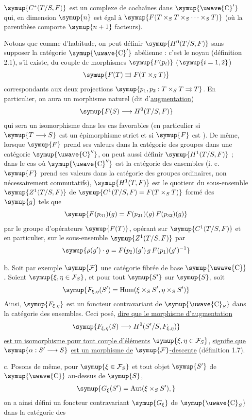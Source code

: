 $\symup{C^*(T/S,F)}$ est un complexe de cochaînes dans $\symup{\text{\uwave{C}}'}$ qui, en dimension
$\symup{n}$ est égal à $\symup{F(T\times_ST\times_S\cdots\times_ST)}$ (où la parenthèse comporte $\symup{n+1}$ facteurs).

Notons que comme d'habitude, on peut définir $\symup{H^0(T/S,F)}$ sans supposer la
catégorie $\symup{\text{\uwave{C}}'}$ abélienne : c'est le noyau (définition 2.1), s'il
existe, du couple de morphismes $\symup{F(p_i)}$ ($\symup{i=1,2}$)
\[
  \symup{F(T)\rightrightarrows F(T\times_ST)}
\]
correspondants aux deux projections
$\symup{p_1,p_2:T\times_ST\rightrightarrows T}$. En particulier, on aura un morphisme
naturel (dit d'\uline{augmentation})
\[
  \symup{F(S)\longrightarrow H^0(T/S,F)}
\]
qui sera un isomorphisme dans les cas favorables (en particulier si
$\symup{T\longrightarrow S}$ est un épimorphisme strict et si $\symup{F}$ est ). De même, lorsque $\symup{F}$ prend ses valeurs dans la catégorie des groupes
dans une catégorie $\symup{\text{\uwave{C}}''}$, on peut aussi définir $\symup{H^1(T/S,F)}$ ; dans le
cas où $\symup{\text{\uwave{C}}''}$ est la catégorie des ensembles (i. e. $\symup{F}$ prend ses
valeurs dans la catégorie des groupes ordinaires, non nécessairement
commutatifs), $\symup{H^1(T,F)}$ est le quotient du sous-ensemble $\symup{Z^1(T/S,F)}$ de
$\symup{C^1(T/S,F)=F(T\times_ST)}$ formé des $\symup{g}$ tels que
\[
  \symup{F(p_{31})(g)=F(p_{21})(g)\,F(p_{32})(g)}
\]
par le groupe d'opérateurs $\symup{F(T)}$, opérant sur $\symup{C^1(T/S,F)}$ et en particulier,
sur le sous-ensemble $\symup{Z^1(T/S,F)}$ par
\[
  \symup{\rho(g')\cdot g=F(p_2)(g')\,g\,F(p_1)(g')^{-1}}
\]

\medskip\noindent
b. Soit par exemple $\symup{\mathcal F}$ une catégorie fibrée de base $\symup{\text{\uwave{C}}}$.
Soient $\symup{\xi,\eta\in\mathcal F_S}$, et pour tout $\symup{S'}$ sur $\symup{S}$, soit
\[
  \symup{F_{\xi,\eta}(S')=
  \operatorname{Hom}(\xi\times_SS',\eta\times_SS')}
\]
Ainsi, $\symup{F_{\xi,\eta}}$ est un foncteur contravariant de $\symup{\text{\uwave{C}}_S}$ dans la
catégorie des ensembles. Ceci posé, \uline{dire que le morphisme d'augmentation}
\[
  \symup{F_{\xi,\eta}(S)\longrightarrow H^0(S'/S,F_{\xi,\eta})}
\]
\uline{est un isomorphisme pour tout couple d'éléments} $\symup{\xi,\eta\in\mathcal F_S}$, \uline{signifie que} $\symup{\alpha:S'\longrightarrow S}$ \uline{est un morphisme de} $\symup{\mathcal F}$\uline{-descente}
(définition 1.7).

\medskip\noindent
c. Posons de même, pour $\symup{\xi\in\mathcal F_S}$ et tout objet $\symup{S'}$ de $\symup{\text{\uwave{C}}}$
au-dessus de $\symup{S}$,
\[
  \symup{G_\xi(S')=\operatorname{Aut}(\xi\times_SS'),}
\]
on a ainsi défini un foncteur contravariant $\symup{G_\xi}$ de $\symup{\text{\uwave{C}}_S}$ dans la
catégorie des

